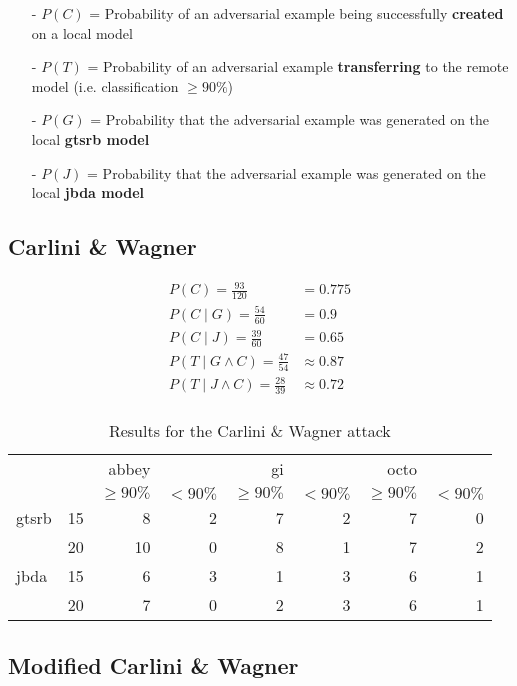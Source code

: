 \begin{itemize}
\item[-] $P(C)$ = Probability of an adversarial example being successfully \textbf{created} on a local model
\item[-] $P(T)$ = Probability of an adversarial example \textbf{transferring} to the remote model (i.e. classification $\geq90\%$)
\item[-] $P(G)$ = Probability that the adversarial example was generated on the local \textbf{gtsrb model}
\item[-] $P(J)$ = Probability that the adversarial example was generated on the local \textbf{jbda model}
\end{itemize}

\subsection{Carlini \& Wagner}



\begin{align}
P(C) = \frac{93}{120} &= 0.775\\[1ex]
P(C \mid G) = \frac{54}{60} &= 0.9\\[1ex]
P(C \mid J) = \frac{39}{60} &= 0.65\\[1ex]
P(T \mid G \wedge C) = \frac{47}{54} &\approx 0.87\\[1ex]
P(T \mid J \wedge C) = \frac{28}{39} &\approx 0.72\\[1ex]
\end{align}

\begin{table}
\begin{tabular}{l l | r r | r r | r r}
& & abbey & & gi & & octo & \\[1ex]
& & \footnotesize$\geq90\%$ & \footnotesize$<90\%$ & \footnotesize$\geq90\%$ & \footnotesize$<90\%$ & \footnotesize$\geq90\%$ & \footnotesize$<90\%$ \\[1ex]
\hline
gtsrb & 15 & 8 & 2 & 7 & 2 & 7 & 0 \\[1ex]
& 20 & 10 & 0 & 8 & 1 & 7 & 2 \\[1ex]
\hline
jbda & 15 & 6 & 3 & 1 & 3 & 6 & 1 \\[1ex]
& 20 & 7 & 0 & 2 & 3 & 6 & 1
\end{tabular}
\caption{Results for the Carlini \& Wagner attack}
\label{tab:cwl2_result}
\end{table}

\subsection{Modified Carlini \& Wagner}

